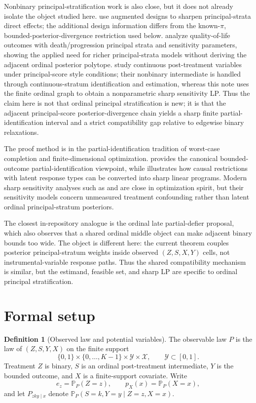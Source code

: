 \documentclass[11pt]{article}
\renewcommand{\Pr}{\mathbb{P}}
\theoremstyle{definition}
\newtheorem{definition}{Definition}
\theoremstyle{plain}
\theoremstyle{remark}
\begin{document}
Nonbinary principal-stratification work is also close, but it does not already
isolate the object studied here.  \cite{MatteiMealli2011} use augmented
designs to sharpen principal-strata direct effects; the additional design
information differs from the known-\(\pi\), bounded-posterior-divergence
restriction used below.  \cite{LeeDanielsSargent2010} analyze quality-of-life
outcomes with death/progression principal strata and sensitivity parameters,
showing the applied need for richer principal-strata models without deriving
the adjacent ordinal posterior polytope.  \cite{LuJiangDing2024} study
continuous post-treatment variables under principal-score style conditions;
their nonbinary intermediate is handled through continuous-stratum
identification and estimation, whereas this note uses the finite ordinal graph
to obtain a nonparametric sharp sensitivity LP.  Thus the claim here is not
that ordinal principal stratification is new; it is that the adjacent
principal-score posterior-divergence chain yields a sharp finite
partial-identification interval and a strict compatibility gap relative to
edgewise binary relaxations.

The proof method is in the partial-identification tradition of worst-case
completion and finite-dimensional optimization.  \cite{Manski1990} provides the
canonical bounded-outcome partial-identification viewpoint, while
\cite{BalkePearl1997} illustrates how causal restrictions with latent response
types can be converted into sharp linear programs.  Modern sharp sensitivity
analyses such as \cite{DornGuoKallus2022} and
\cite{FrauenMelnychukFeuerriegel2023} are close in optimization spirit, but
their sensitivity models concern unmeasured treatment confounding rather than
latent ordinal principal-stratum posteriors.

The closest in-repository analogue is the ordinal late partial-defier proposal,
which also observes that a shared ordinal middle object can make adjacent
binary bounds too wide.  The object is different here: the current theorem
couples posterior principal-stratum weights inside observed
\((Z,S,X,Y)\) cells, not instrumental-variable response paths.  Thus the
shared compatibility mechanism is similar, but the estimand, feasible set, and
sharp LP are specific to ordinal principal stratification.

\section{Formal setup}
\begin{definition}[Observed law and potential variables]\label{def:observed-law}
The observable law \(P\) is the law of \((Z,S,Y,X)\) on the finite support
\[
  \{0,1\}\times\{0,\ldots,K-1\}\times\mathcal Y\times\mathcal X,
  \qquad \mathcal Y\subset[0,1].
\]
Treatment \(Z\) is binary, \(S\) is an ordinal post-treatment intermediate,
\(Y\) is the bounded outcome, and \(X\) is a finite-support covariate.  Write
\[
  e_z=\Pr_P(Z=z),\qquad
  p_X(x)=\Pr_P(X=x),
\]
and let \(P_{zky\mid x}\) denote
\(\Pr_P(S=k,Y=y\mid Z=z,X=x)\).
\end{definition}
\end{document}
